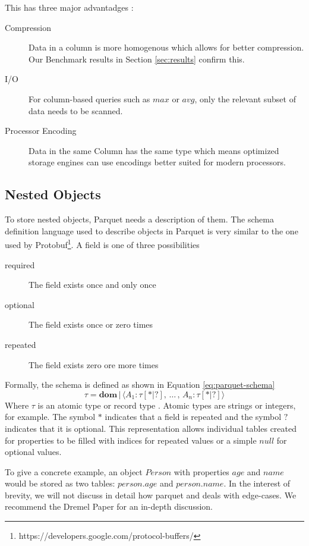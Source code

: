 This has three major advantadges \cite{dremel-parquet:Twitter}:
\begin{description}
\item[Compression] Data in a column is more homogenous which allows for better compression. Our Benchmark results in Section \ref{sec:results} confirm this.
\item[I/O] For column-based queries such as $max$ or $avg$, only the relevant subset of data needs to be scanned.
\item[Processor Encoding] Data in the same Column has the same type which means optimized storage engines can use encodings better suited for modern processors.
\end{description}

\subsection{Nested Objects}
\label{section:parquet-nested}
To store nested objects, Parquet needs a description of them.
The schema definition language used to describe objects in Parquet is very similar to the one used by Protobuf\footnote{https://developers.google.com/protocol-buffers/}.
A field is one of three possibilities

\begin{description}
\item[required] The field exists once and only once
\item[optional] The field exists once or zero times
\item[repeated] The field exists zero ore more times
\end{description}

Formally, the schema is defined as shown in Equation \ref{eq:parquet-schema}
\begin{equation}
\label{eq:parquet-schema}
\tau = \mathbf{dom} \,|\, \langle A_{1} : \tau [*|?], \, \dots \,, \,  A_{n} : \tau [*|?]\rangle
\end{equation}
Where $\tau$ is an atomic type or record type \cite{dremel:melnik}. Atomic types are strings or integers, for example.
The symbol $*$ indicates that a field is repeated and the symbol $?$ indicates that it is optional.
This representation allows individual tables created for properties to be filled with indices for repeated values or a simple $null$ for optional values.

To give a concrete example, an object $Person$ with properties $age$ and $name$ would be stored as two tables: $person.age$ and $person.name$.
In the interest of brevity, we will not discuss in detail how parquet and deals with edge-cases.
We recommend the Dremel Paper\cite{dremel:melnik} for an in-depth discussion.
\newpage
